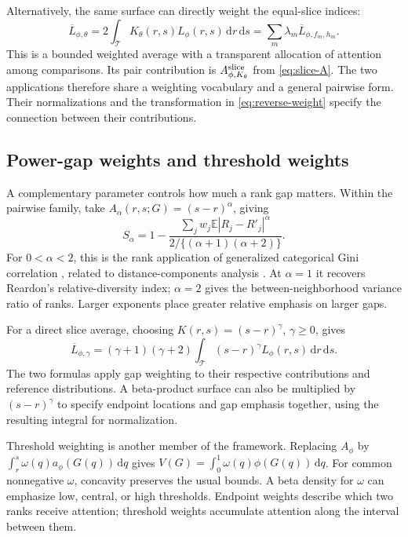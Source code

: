 \documentclass[11pt]{article}
\newcommand{\E}{\mathbb{E}}
\newcommand{\dd}{\,\mathrm{d}}
\newcommand{\T}{\mathcal{T}}
\begin{document}
Alternatively, the same surface can directly weight the equal-slice indices:
\begin{equation}
\overline L_{\phi,\theta}
=2\int_{\T}K_\theta(r,s)L_\phi(r,s)\dd r\dd s
=\sum_m\lambda_m\overline L_{\phi,f_m,h_m}.
\label{eq:beta-slices}
\end{equation}
This is a bounded weighted average with a transparent allocation of attention among comparisons. Its pair contribution is $A^{\rm slice}_{\phi,K_\theta}$ from \eqref{eq:slice-A}. The two applications therefore share a weighting vocabulary and a general pairwise form. Their normalizations and the transformation in \eqref{eq:reverse-weight} specify the connection between their contributions.

\subsection{Power-gap weights and threshold weights}

A complementary parameter controls how much a rank gap matters. Within the pairwise family, take $A_\alpha(r,s;G)=(s-r)^\alpha$, giving
\begin{equation}
S_\alpha=
1-\frac{\sum_jw_j\E|R_j-R'_j|^\alpha}
{2/\{(\alpha+1)(\alpha+2)\}}.
\label{eq:power}
\end{equation}
For $0<\alpha<2$, this is the rank application of generalized categorical Gini correlation \citep{dang2021}, related to distance-components analysis \citep{rizzo2010}. At $\alpha=1$ it recovers Reardon's relative-diversity index; $\alpha=2$ gives the between-neighborhood variance ratio of ranks. Larger exponents place greater relative emphasis on larger gaps.

For a direct slice average, choosing $K(r,s)=(s-r)^\gamma$, $\gamma\geq0$, gives
\[
\overline L_{\phi,\gamma}
=(\gamma+1)(\gamma+2)\int_{\T}(s-r)^\gamma L_\phi(r,s)\dd r\dd s.
\]
The two formulas apply gap weighting to their respective contributions and reference distributions. A beta-product surface can also be multiplied by $(s-r)^\gamma$ to specify endpoint locations and gap emphasis together, using the resulting integral for normalization.

Threshold weighting is another member of the framework. Replacing $A_\phi$ by
$\int_r^s\omega(q)a_\phi(G(q))\dd q$ gives
$V(G)=\int_0^1\omega(q)\phi(G(q))\dd q$.
For common nonnegative $\omega$, concavity preserves the usual bounds. A beta density for $\omega$ can emphasize low, central, or high thresholds. Endpoint weights describe which two ranks receive attention; threshold weights accumulate attention along the interval between them.
\end{document}
